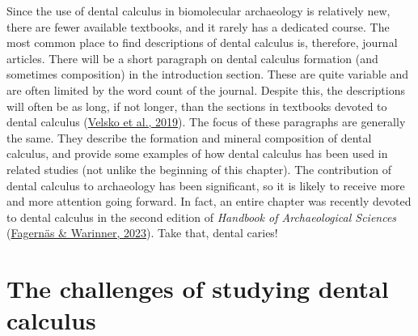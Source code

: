 \documentclass[
  letterpaper,
]{book}
\begin{document}
Since the use of dental calculus in biomolecular archaeology is
relatively new, there are fewer available textbooks, and it rarely has a
dedicated course. The most common place to find descriptions of dental
calculus is, therefore, journal articles. There will be a short
paragraph on dental calculus formation (and sometimes composition) in
the introduction section. These are quite variable and are often limited
by the word count of the journal. Despite this, the descriptions will
often be as long, if not longer, than the sections in textbooks devoted
to dental calculus
(\protect\hyperlink{ref-velskoMicrobialDifferences2019}{Velsko et al.,
2019}). The focus of these paragraphs are generally the same. They
describe the formation and mineral composition of dental calculus, and
provide some examples of how dental calculus has been used in related
studies (not unlike the beginning of this chapter). The contribution of
dental calculus to archaeology has been significant, so it is likely to
receive more and more attention going forward. In fact, an entire
chapter was recently devoted to dental calculus in the second edition of
\emph{Handbook of Archaeological Sciences}
(\protect\hyperlink{ref-fagernasDentalCalculus2023}{Fagernäs \&
Warinner, 2023}). Take that, dental caries!

\hypertarget{the-challenges-of-studying-dental-calculus}{%
\section{The challenges of studying dental
calculus}\label{the-challenges-of-studying-dental-calculus}}
\end{document}
